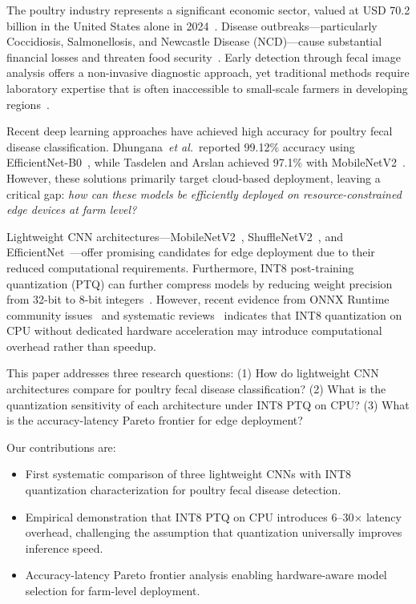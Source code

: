 \documentclass[conference,a4paper]{IEEEtran}
\begin{document}
The poultry industry represents a significant economic sector, valued at USD 70.2 billion in the United States alone in 2024~\cite{dhungana2025}. Disease outbreaks---particularly Coccidiosis, Salmonellosis, and Newcastle Disease (NCD)---cause substantial financial losses and threaten food security~\cite{machuve2022}. Early detection through fecal image analysis offers a non-invasive diagnostic approach, yet traditional methods require laboratory expertise that is often inaccessible to small-scale farmers in developing regions~\cite{tasdelen2025}.

Recent deep learning approaches have achieved high accuracy for poultry fecal disease classification. Dhungana~\textit{et al.}~reported 99.12\% accuracy using EfficientNet-B0~\cite{dhungana2025}, while Tasdelen and Arslan achieved 97.1\% with MobileNetV2~\cite{tasdelen2025}. However, these solutions primarily target cloud-based deployment, leaving a critical gap: \textit{how can these models be efficiently deployed on resource-constrained edge devices at farm level?}

Lightweight CNN architectures---MobileNetV2~\cite{mobilenetv2}, ShuffleNetV2~\cite{shufflenetv2}, and EfficientNet~\cite{efficientnet}---offer promising candidates for edge deployment due to their reduced computational requirements. Furthermore, INT8 post-training quantization (PTQ) can further compress models by reducing weight precision from 32-bit to 8-bit integers~\cite{jacob2018}. However, recent evidence from ONNX Runtime community issues~\cite{onnxruntime6732, onnxruntime12854} and systematic reviews~\cite{maulana2026} indicates that INT8 quantization on CPU without dedicated hardware acceleration may introduce computational overhead rather than speedup.

This paper addresses three research questions: (1) How do lightweight CNN architectures compare for poultry fecal disease classification? (2) What is the quantization sensitivity of each architecture under INT8 PTQ on CPU? (3) What is the accuracy-latency Pareto frontier for edge deployment?

Our contributions are:
\begin{itemize}
    \item First systematic comparison of three lightweight CNNs with INT8 quantization characterization for poultry fecal disease detection.
    \item Empirical demonstration that INT8 PTQ on CPU introduces 6--30$\times$ latency overhead, challenging the assumption that quantization universally improves inference speed.
    \item Accuracy-latency Pareto frontier analysis enabling hardware-aware model selection for farm-level deployment.
\end{itemize}
\end{document}
